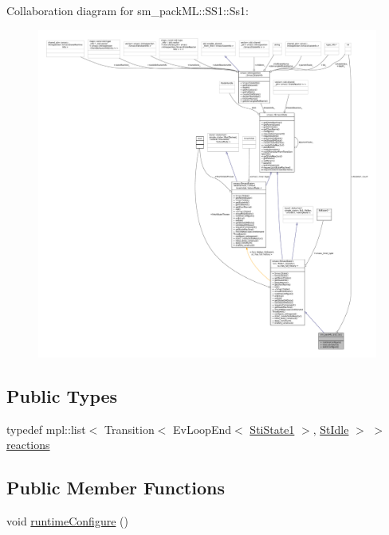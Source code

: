 Collaboration diagram for sm\+\_\+pack\+ML\+:\+:S\+S1\+:\+:Ss1\+:
\nopagebreak
\begin{figure}[H]
\begin{center}
\leavevmode
\includegraphics[width=350pt]{structsm__packML_1_1SS1_1_1Ss1__coll__graph}
\end{center}
\end{figure}
\subsection*{Public Types}
\begin{DoxyCompactItemize}
\item 
typedef mpl\+::list$<$ Transition$<$ Ev\+Loop\+End$<$ \hyperlink{structsm__packML_1_1ss1__states_1_1StiState1}{Sti\+State1} $>$, \hyperlink{structsm__packML_1_1StIdle}{St\+Idle} $>$ $>$ \hyperlink{structsm__packML_1_1SS1_1_1Ss1_a1a3f9a298464fde020614c7e0f21c57e}{reactions}
\end{DoxyCompactItemize}
\subsection*{Public Member Functions}
\begin{DoxyCompactItemize}
\item 
void \hyperlink{structsm__packML_1_1SS1_1_1Ss1_a6dbc02368ee5b089dbaa608b8de4e861}{runtime\+Configure} ()
\end{DoxyCompactItemize}
